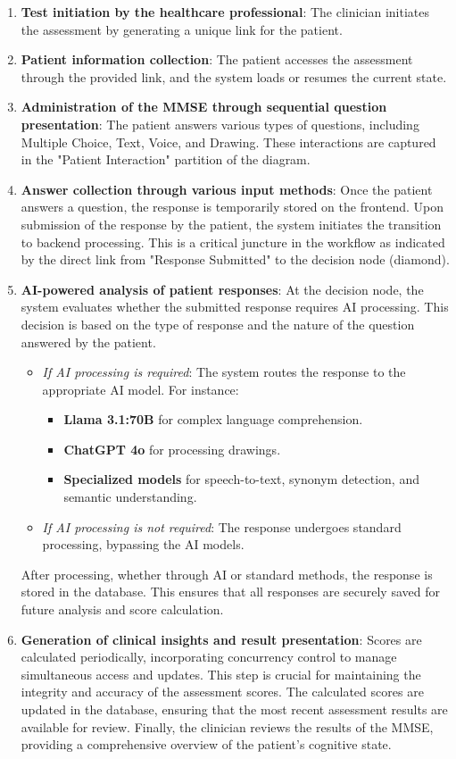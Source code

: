 \begin{enumerate}
    \item \textbf{Test initiation by the healthcare professional}: The clinician initiates the assessment by generating a unique link for the patient.
    \item \textbf{Patient information collection}: The patient accesses the assessment through the provided link, and the system loads or resumes the current state.
    \item \textbf{Administration of the MMSE through sequential question presentation}: The patient answers various types of questions, including Multiple Choice, Text, Voice, and Drawing. These interactions are captured in the "Patient Interaction" partition of the diagram.
    \item \textbf{Answer collection through various input methods}: Once the patient answers a question, the response is temporarily stored on the frontend. Upon submission of the response by the patient, the system initiates the transition to backend processing. This is a critical juncture in the workflow as indicated by the direct link from "Response Submitted" to the decision node (diamond).
    \item \textbf{AI-powered analysis of patient responses}: At the decision node, the system evaluates whether the submitted response requires AI processing. This decision is based on the type of response and the nature of the question answered by the patient.
    \begin{itemize}
        \item \textit{If AI processing is required}: The system routes the response to the appropriate AI model. For instance:
        \begin{itemize}
            \item \textbf{Llama 3.1:70B} for complex language comprehension.
            \item \textbf{ChatGPT 4o} for processing drawings.
            \item \textbf{Specialized models} for speech-to-text, synonym detection, and semantic understanding.
        \end{itemize}
        \item \textit{If AI processing is not required}: The response undergoes standard processing, bypassing the AI models.
    \end{itemize}
    After processing, whether through AI or standard methods, the response is stored in the database. This ensures that all responses are securely saved for future analysis and score calculation.
    \item \textbf{Generation of clinical insights and result presentation}: Scores are calculated periodically, incorporating concurrency control to manage simultaneous access and updates. This step is crucial for maintaining the integrity and accuracy of the assessment scores. The calculated scores are updated in the database, ensuring that the most recent assessment results are available for review. Finally, the clinician reviews the results of the MMSE, providing a comprehensive overview of the patient’s cognitive state.
\end{enumerate}

